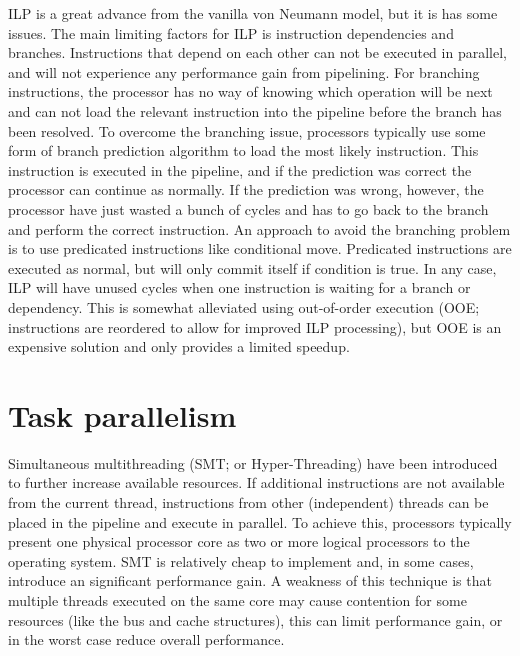\documentclass[12pt,a4paper,twoside]{report}
\begin{document}
{	ILP is a great advance from the vanilla von Neumann model, but it
	is has some issues. The main limiting factors for ILP is
	instruction dependencies and branches. Instructions that depend on
	each other can not be executed in parallel, and will not
	experience any performance gain from pipelining. For branching
	instructions, the processor has no way of knowing which operation
	will be next and can not load the relevant instruction into the
	pipeline before the branch has been resolved. To overcome the
	branching issue, processors typically use some form of branch
	prediction algorithm to load the most likely instruction. This
	instruction is executed in the pipeline, and if the prediction was
	correct the processor can continue as normally. If the prediction
	was wrong, however, the processor have just wasted a bunch of
	cycles and has to go back to the branch and perform the correct
	instruction. An approach to avoid the branching problem is to use
	predicated instructions like conditional move. Predicated
	instructions are executed as normal, but will only commit itself
	if condition is true. In any case, ILP will have unused cycles
	when one instruction is waiting for a branch or dependency. This
	is somewhat alleviated using out-of-order execution (OOE; instructions
	are reordered to allow for improved ILP processing), but OOE is an
	expensive solution and only provides a limited speedup.


	\section{Task parallelism}

	Simultaneous multithreading (SMT; or Hyper-Threading) have been
	introduced to further increase available resources. If additional
	instructions are not available from the current thread,
	instructions from other (independent) threads can be placed in the
	pipeline and execute in parallel. To achieve this, processors
	typically present one physical processor core as two or more
	logical processors to the operating system. SMT is relatively
	cheap to implement and, in some cases, introduce an significant
	performance gain. A weakness of this technique is that multiple
	threads executed on the same core may cause contention for some
	resources (like the bus and cache structures), this can limit
	performance gain, or in the worst case reduce overall performance.

}
\end{document}
